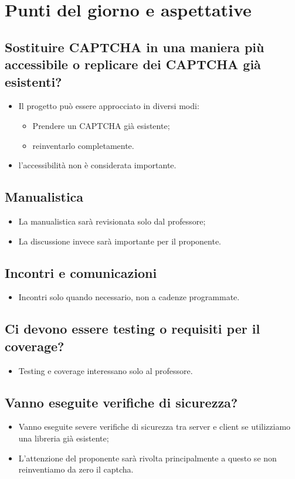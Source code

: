 \section{Punti del giorno e aspettative}
    \subsection{Sostituire CAPTCHA in una maniera più accessibile o replicare dei CAPTCHA già esistenti?}
        \begin{itemize}
            \item Il progetto può essere approcciato in diversi modi:
            \begin{itemize}
                \item Prendere un CAPTCHA già esistente;
                \item reinventarlo completamente.
            \end{itemize}
            \item l'accessibilità non è considerata importante.
        \end{itemize}
    \subsection{Manualistica}
        \begin{itemize}
            \item La manualistica sarà revisionata solo dal professore;
            \item La discussione invece sarà importante per il proponente.
        \end{itemize}
    \subsection{Incontri e comunicazioni}
        \begin{itemize}
            \item Incontri solo quando necessario, non a cadenze programmate.
        \end{itemize}
    \subsection{Ci devono essere testing o requisiti per il coverage?}
        \begin{itemize}
            \item Testing e coverage interessano solo al professore.
        \end{itemize}
    \subsection{Vanno eseguite verifiche di sicurezza?}
        \begin{itemize}
            \item Vanno eseguite severe verifiche di sicurezza tra server e client se utilizziamo una libreria già esistente;
            \item L'attenzione del proponente sarà rivolta principalmente a questo se non reinventiamo da zero il captcha.
        \end{itemize}